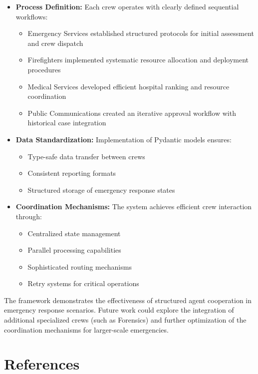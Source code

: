 \documentclass[12pt,a4paper]{article}
\begin{document}
\begin{itemize}
    \item \textbf{Process Definition:} Each crew operates with clearly defined sequential workflows:
    \begin{itemize}
        \item Emergency Services established structured protocols for initial assessment and crew dispatch
        \item Firefighters implemented systematic resource allocation and deployment procedures
        \item Medical Services developed efficient hospital ranking and resource coordination
        \item Public Communications created an iterative approval workflow with historical case integration
    \end{itemize}
    
    \item \textbf{Data Standardization:} Implementation of Pydantic models ensures:
    \begin{itemize}
        \item Type-safe data transfer between crews
        \item Consistent reporting formats
        \item Structured storage of emergency response states
    \end{itemize}
    
    \item \textbf{Coordination Mechanisms:} The system achieves efficient crew interaction through:
    \begin{itemize}
        \item Centralized state management
        \item Parallel processing capabilities
        \item Sophisticated routing mechanisms
        \item Retry systems for critical operations
    \end{itemize}
\end{itemize}

The framework demonstrates the effectiveness of structured agent cooperation in emergency response scenarios. Future work could explore the integration of additional specialized crews (such as Forensics) and further optimization of the coordination mechanisms for larger-scale emergencies.

\section{References}


\end{document}
